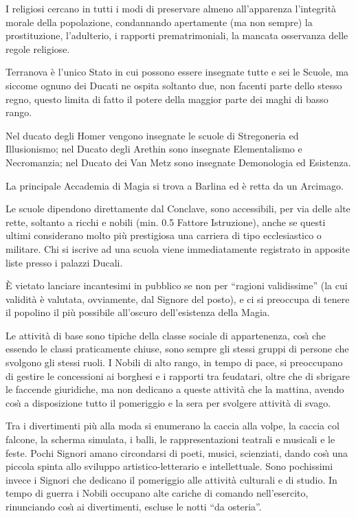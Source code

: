 I religiosi cercano in tutti i modi di preservare almeno all'apparenza
l'integrit\`a morale della popolazione, condannando apertamente (ma
non sempre) la prostituzione, l'adulterio, i rapporti prematrimoniali,
la mancata osservanza delle regole religiose.

\Magia Terranova \`e l'unico Stato in cui possono essere insegnate
tutte e sei le Scuole, ma siccome ognuno dei Ducati ne ospita soltanto
due, non facenti parte dello stesso regno, questo limita di fatto il
potere della maggior parte dei maghi di basso rango. 

Nel ducato degli Homer vengono insegnate le scuole di Stregoneria ed
Illusionismo; nel Ducato degli Arethin sono insegnate Elementalismo e
Necromanzia; nel Ducato dei Van Metz sono insegnate Demonologia ed
Esistenza.

La principale Accademia di Magia si trova a Barlina ed \`e retta da
un Arcimago. 

Le scuole dipendono direttamente dal Conclave, sono accessibili, per
via delle alte rette, soltanto a ricchi e nobili (min. 0.5 Fattore
Istruzione), anche se questi ultimi considerano molto pi\`u
prestigiosa una carriera di tipo ecclesiastico o militare. Chi si
iscrive ad una scuola viene immediatamente registrato in apposite
liste presso i palazzi Ducali.

\`E vietato lanciare incantesimi in pubblico se non per ``ragioni
validissime'' (la cui validit\`a \`e valutata, ovviamente, dal Signore
del posto), e ci si preoccupa di tenere il popolino il pi\`u possibile
all'oscuro dell'esistenza della Magia.

\Moda Le attivit\`a di base sono tipiche della classe sociale di
appartenenza, cos\`{\i}  che essendo le classi praticamente chiuse,
sono sempre gli stessi gruppi di persone che svolgono gli stessi
ruoli. I Nobili di alto rango, in tempo di pace, si preoccupano di
gestire le concessioni ai borghesi e i rapporti tra feudatari, oltre
che di sbrigare le faccende giuridiche, ma non dedicano a queste
attivit\`a che la mattina, avendo cos\`{\i}  a disposizione tutto il
pomeriggio e la sera per svolgere attivit\`a di svago.

 Tra i divertimenti pi\`u alla moda si enumerano la caccia
alla volpe, la caccia col falcone, la scherma simulata, i balli, le
rappresentazioni teatrali e musicali e le feste.  Pochi Signori amano
circondarsi di poeti, musici, scienziati, dando cos\`{\i}  una piccola
spinta allo sviluppo artistico-letterario e intellettuale. Sono
pochissimi invece i Signori che dedicano il pomeriggio alle
attivit\`a culturali e di studio. In tempo di guerra i Nobili
occupano alte cariche di comando nell'esercito, rinunciando cos\`{\i} 
ai divertimenti, escluse le notti ``da osteria''. 

